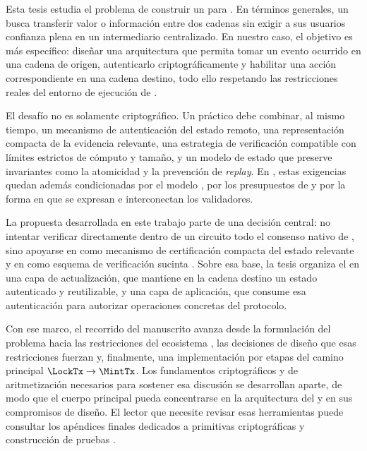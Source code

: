 Esta tesis estudia el problema de construir un \zkBridge para \Cardano. En términos generales, un \Bridge busca transferir valor o información entre dos cadenas sin exigir a sus usuarios confianza plena en un intermediario centralizado. En nuestro caso, el objetivo es más específico: diseñar una arquitectura que permita tomar un evento ocurrido en una cadena de origen, autenticarlo criptográficamente y habilitar una acción correspondiente en una cadena destino, todo ello respetando las restricciones reales del entorno de ejecución de \Cardano.

El desafío no es solamente criptográfico. Un \zkBridge práctico debe combinar, al mismo tiempo, un mecanismo de autenticación del estado remoto, una representación compacta de la evidencia relevante, una estrategia de verificación \Onchain compatible con límites estrictos de cómputo y tamaño, y un modelo de estado que preserve invariantes como la atomicidad y la prevención de \textit{replay}. En \Cardano, estas exigencias quedan además condicionadas por el modelo \eUTxO, por los presupuestos de \ExUnits y por la forma en que se expresan e interconectan los validadores.

La propuesta desarrollada en este trabajo parte de una decisión central: no intentar verificar directamente dentro de un circuito \ZK todo el consenso nativo de \Cardano, sino apoyarse en \Mithril como mecanismo de certificación compacta del estado relevante y en \Groth como esquema de verificación sucinta \Onchain. Sobre esa base, la tesis organiza el \zkBridge en una capa de actualización, que mantiene en la cadena destino un estado autenticado y reutilizable, y una capa de aplicación, que consume esa autenticación para autorizar operaciones concretas del protocolo.

Con ese marco, el recorrido del manuscrito avanza desde la formulación del problema hacia las restricciones del ecosistema \Cardano, las decisiones de diseño que esas restricciones fuerzan y, finalmente, una implementación por etapas del camino principal \(\LockTx \rightarrow \MintTx\). Los fundamentos criptográficos y de aritmetización necesarios para sostener esa discusión se desarrollan aparte, de modo que el cuerpo principal pueda concentrarse en la arquitectura del \zkBridge y en sus compromisos de diseño. El lector que necesite revisar esas herramientas puede consultar los apéndices finales dedicados a primitivas criptográficas y construcción de pruebas \SNARK.

